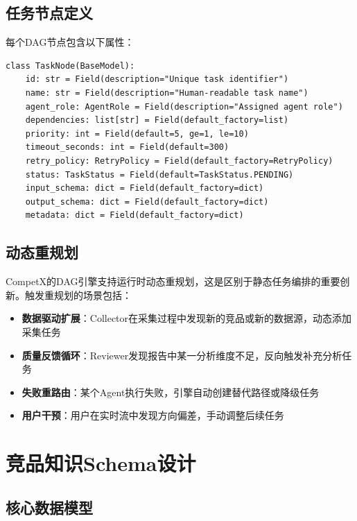 \documentclass[12pt,a4paper]{ctexrep}
\begin{document}
\subsection{任务节点定义}

每个DAG节点包含以下属性：

\begin{lstlisting}[language=Python3,caption=DAG任务节点数据模型,label=lst:dag-node]
class TaskNode(BaseModel):
    id: str = Field(description="Unique task identifier")
    name: str = Field(description="Human-readable task name")
    agent_role: AgentRole = Field(description="Assigned agent role")
    dependencies: list[str] = Field(default_factory=list)
    priority: int = Field(default=5, ge=1, le=10)
    timeout_seconds: int = Field(default=300)
    retry_policy: RetryPolicy = Field(default_factory=RetryPolicy)
    status: TaskStatus = Field(default=TaskStatus.PENDING)
    input_schema: dict = Field(default_factory=dict)
    output_schema: dict = Field(default_factory=dict)
    metadata: dict = Field(default_factory=dict)
\end{lstlisting}

\subsection{动态重规划}

CompetX的DAG引擎支持运行时动态重规划，这是区别于静态任务编排的重要创新。触发重规划的场景包括：

\begin{itemize}[leftmargin=2em]
\item \textbf{数据驱动扩展}：Collector在采集过程中发现新的竞品或新的数据源，动态添加采集任务
\item \textbf{质量反馈循环}：Reviewer发现报告中某一分析维度不足，反向触发补充分析任务
\item \textbf{失败重路由}：某个Agent执行失败，引擎自动创建替代路径或降级任务
\item \textbf{用户干预}：用户在实时流中发现方向偏差，手动调整后续任务
\end{itemize}

\section{竞品知识Schema设计}

\subsection{核心数据模型}
\end{document}
